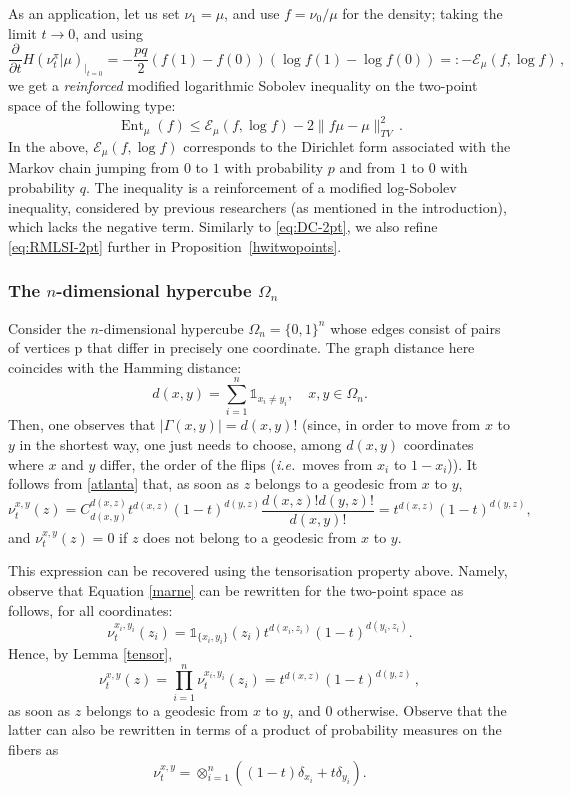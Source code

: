 \documentclass[11pt]{amsart}
\numberwithin{equation}{section}
\begin{document}
As an application, let us set $\nu_1=\mu$,  and use $f=\nu_0/\mu$ for the density; taking the limit $t \to 0$, and using
$$
\frac{\partial}{\partial t} H(\nu_t^\pi | \mu)_{|_{t=0}}  
= 
- \frac{pq}{2} (f(1)-f(0))(\log f(1) - \log f(0))
=:
 -  \mathcal{E}_\mu(f, \log f)\,,
$$ 
we get a {\em reinforced} modified logarithmic Sobolev inequality on the two-point space of the following type:
\begin{equation}\label{eq:RMLSI-2pt}
{\operatorname{Ent}}_\mu(f) \le \mathcal{E}_\mu(f, \log f) - 2 \|f\mu - \mu\|_{TV}^2\,.
\end{equation}
In the above,  $\mathcal{E}_\mu(f, \log f)$ corresponds to the Dirichlet form associated with the Markov chain jumping from $0$ to $1$ with probability $p$ and from $1$ to $0$ with probability $q$.  The inequality is a reinforcement of a modified log-Sobolev inequality, considered by previous researchers (as mentioned in the introduction), which lacks the negative term. Similarly to \eqref{eq:DC-2pt}, we also refine \eqref{eq:RMLSI-2pt} further in Proposition~\ref{hwitwopoints}.

\subsubsection{The $n$-dimensional hypercube $\Omega_n$} \label{sec:hypercube}

Consider the $n$-dimensional hypercube $\Omega_n=\{0,1\}^n$ whose edges consist of pairs of vertices p that differ  in precisely one coordinate. The graph distance here coincides with the Hamming distance:
$$
d(x,y)= \sum_{i=1}^n {\mathds{1}}_{x_i \neq y_i} ,\quad x,y \in \Omega_n.
$$
Then, one observes that $|\Gamma(x,y)|=d(x,y)!$ (since, in order to move from $x$ to $y$ in the shortest way, one just needs to choose, among $d(x,y)$ coordinates where $x$ and $y$ differ, the order of the flips ({\it i.e.}\ moves from $x_i$ to $1-x_i$)). It follows from \eqref{atlanta} that, as soon as $z$ belongs to a geodesic from $x$ to $y$,
$$
\nu_t^{x,y}(z) = C_{d(x,y)}^{d(x,z)} t^{d(x,z)}(1-t)^{d(y,z)} \frac{d(x,z)! d(y,z)!}{d(x,y)!} =
t^{d(x,z)}(1-t)^{d(y,z)},
$$
and $\nu_t^{x,y}(z)=0$ if $z$ does not belong to a geodesic from $x$ to $y$.

This expression can be recovered using the tensorisation property above. Namely, observe that Equation \eqref{marne} can be rewritten for the two-point space as follows, for all coordinates:
$$
\nu_t^{x_i,y_i}(z_i)= {\mathds{1}}_{\{x_i,y_i\}}(z_i) t^{d(x_i,z_i)}(1-t)^{d(y_i,z_i)} .
$$
Hence, by Lemma \ref{tensor}, 
$$
\nu_t^{x,y}(z) = \prod_{i=1}^n \nu_t^{x_i,y_i}(z_i) = t^{d(x,z)}(1-t)^{d(y,z)}\,,
$$
as soon as $z$ belongs to a geodesic from $x$ to $y$, and $0$ otherwise. Observe that the latter can also be rewritten 
in terms of a product of probability measures on the fibers as
\begin{equation} \label{product}
\nu_t^{x,y} = \otimes_{i=1}^n ((1-t) \delta_{x_i} + t\delta_{y_i}) .
\end{equation}
\end{document}
